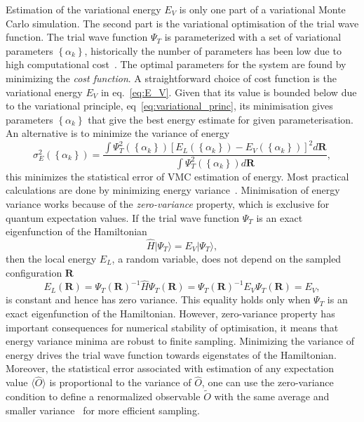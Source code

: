 \documentclass[final,3p,times,twocolumn]{elsarticle}
\begin{document}
	Estimation of the variational energy $E_V$ is only one part of a variational Monte Carlo simulation. The second part is the variational optimisation of the trial wave function. The trial wave function $\Psi_T$ is parameterized with a set of variational parameters $\left\{\alpha_k\right\}$, historically the number of parameters has been low due to high computational cost~\cite{foulkes2001quantum}. The optimal parameters for the system are found by minimizing the \emph{cost function}. A straightforward choice of cost function is the variational energy $E_V$ in eq.~\eqref{eq:E_V}. Given that its value is bounded below due to the variational principle, eq~\eqref{eq:variational_princ}, its minimisation gives parameters $\left\{\alpha_k\right\}$ that give the best energy estimate for given parameterisation. An alternative is to minimize the variance of energy
	\begin{equation}
		\sigma_{E}^{2}(\left\{\alpha_k\right\})=\frac{\int \Psi_{T}^{2}(\left\{\alpha_k\right\})\left[E_{L}(\left\{\alpha_k\right\})-E_{V}(\left\{\alpha_k\right\})\right]^{2} d \mathbf{R}}{\int \Psi_{T}^{2}(\left\{\alpha_k\right\}) d \mathbf{R}},
	\end{equation}	
	this minimizes the statistical error of VMC estimation of energy. Most practical calculations are done by minimizing energy variance~\cite{foulkes2001quantum}. Minimisation of energy variance works because of the \emph{zero-variance} property, which is exclusive for quantum expectation values. If the trial wave function $\Psi_{T}$ is an exact eigenfunction of the Hamiltonian
	\begin{equation}
		\hat H |\Psi_{T}\rangle = E_V |\Psi_{T}\rangle,
	\end{equation}
	then the local energy $E_L$, a random variable, does not depend on the sampled configuration $\mathbf{R}$ 
	\begin{equation}				
		E_{L}(\mathbf{R})=\Psi_{T}(\mathbf{R})^{-1} \hat{H} \Psi_{T}(\mathbf{R}) = \Psi_{T}(\mathbf{R})^{-1} E_V \Psi_{T}(\mathbf{R}) = E_V,
	\end{equation}
	is constant and hence has zero variance. This equality holds only when $\Psi_{T}$ is an exact eigenfunction of the Hamiltonian. However, zero-variance property has important consequences for numerical stability of optimisation, it means that energy variance minima are robust to finite sampling. Minimizing the variance of energy drives the trial wave function towards eigenstates of the Hamiltonian. Moreover, the statistical error associated with estimation of any expectation value $\langle \hat O \rangle$ is proportional to the variance of $\hat O$, one can use the zero-variance condition to define a renormalized observable $\tilde O$ with the same average and smaller variance~\cite{assaraf1999zero} for more efficient sampling. 
\end{document}
